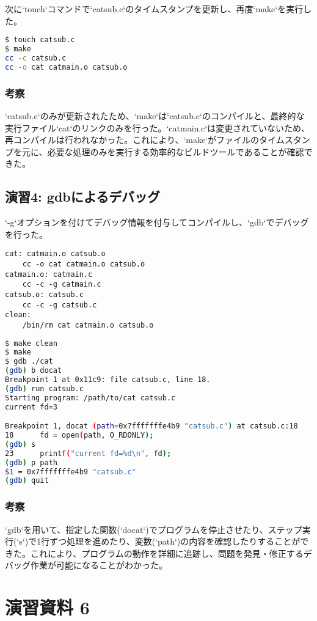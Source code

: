 \documentclass[a4paper,11pt,dvipdfmx]{jsarticle}
\begin{document}
次に`touch`コマンドで`catsub.c`のタイムスタンプを更新し、再度`make`を実行した。
\begin{lstlisting}[language=bash, caption={touchとmakeの再実行}]
$ touch catsub.c
$ make
cc -c catsub.c
cc -o cat catmain.o catsub.o
\end{lstlisting}
\subsubsection{考察}
`catsub.c`のみが更新されたため、`make`は`catsub.c`のコンパイルと、最終的な実行ファイル`cat`のリンクのみを行った。`catmain.c`は変更されていないため、再コンパイルは行われなかった。これにより、`make`がファイルのタイムスタンプを元に、必要な処理のみを実行する効率的なビルドツールであることが確認できた。

\subsection{演習4: gdbによるデバッグ}
`-g`オプションを付けてデバッグ情報を付与してコンパイルし、`gdb`でデバッグを行った。

\begin{lstlisting}[caption={Makefile (デバッグ用)}, label=lst:makefile2]
cat: catmain.o catsub.o
	cc -o cat catmain.o catsub.o
catmain.o: catmain.c
	cc -c -g catmain.c
catsub.o: catsub.c
	cc -c -g catsub.c
clean:
	/bin/rm cat catmain.o catsub.o
\end{lstlisting}

\begin{lstlisting}[language=bash, caption={gdbの実行}]
$ make clean
$ make
$ gdb ./cat
(gdb) b docat
Breakpoint 1 at 0x11c9: file catsub.c, line 18.
(gdb) run catsub.c
Starting program: /path/to/cat catsub.c
current fd=3

Breakpoint 1, docat (path=0x7fffffffe4b9 "catsub.c") at catsub.c:18
18	    fd = open(path, O_RDONLY);
(gdb) s
23	    printf("current fd=%d\n", fd);
(gdb) p path
$1 = 0x7fffffffe4b9 "catsub.c"
(gdb) quit
\end{lstlisting}
\subsubsection{考察}
`gdb`を用いて、指定した関数(`docat`)でプログラムを停止させたり、ステップ実行(`s`)で1行ずつ処理を進めたり、変数(`path`)の内容を確認したりすることができた。これにより、プログラムの動作を詳細に追跡し、問題を発見・修正するデバッグ作業が可能になることがわかった。

\section{演習資料 6}
\end{document}
